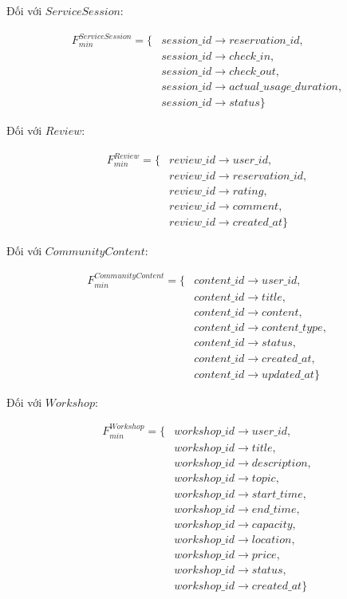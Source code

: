 Đối với $ServiceSession$:

\[
\begin{aligned}
	F_{min}^{ServiceSession}=\{&
	session\_id\rightarrow reservation\_id,\\
	&session\_id\rightarrow check\_in,\\
	&session\_id\rightarrow check\_out,\\
	&session\_id\rightarrow actual\_usage\_duration,\\
	&session\_id\rightarrow status
	\}
\end{aligned}
\]

Đối với $Review$:

\[
\begin{aligned}
	F_{min}^{Review}=\{&
	review\_id\rightarrow user\_id,\\
	&review\_id\rightarrow reservation\_id,\\
	&review\_id\rightarrow rating,\\
	&review\_id\rightarrow comment,\\
	&review\_id\rightarrow created\_at
	\}
\end{aligned}
\]

Đối với $CommunityContent$:

\[
\begin{aligned}
	F_{min}^{CommunityContent}=\{&
	content\_id\rightarrow user\_id,\\
	&content\_id\rightarrow title,\\
	&content\_id\rightarrow content,\\
	&content\_id\rightarrow content\_type,\\
	&content\_id\rightarrow status,\\
	&content\_id\rightarrow created\_at,\\
	&content\_id\rightarrow updated\_at
	\}
\end{aligned}
\]

Đối với $Workshop$:

\[
\begin{aligned}
	F_{min}^{Workshop}=\{&
	workshop\_id\rightarrow user\_id,\\
	&workshop\_id\rightarrow title,\\
	&workshop\_id\rightarrow description,\\
	&workshop\_id\rightarrow topic,\\
	&workshop\_id\rightarrow start\_time,\\
	&workshop\_id\rightarrow end\_time,\\
	&workshop\_id\rightarrow capacity,\\
	&workshop\_id\rightarrow location,\\
	&workshop\_id\rightarrow price,\\
	&workshop\_id\rightarrow status,\\
	&workshop\_id\rightarrow created\_at
	\}
\end{aligned}
\]

